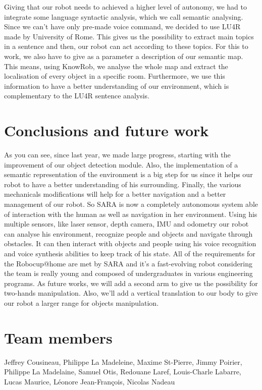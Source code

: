 \documentclass[runningheads,a4paper]{llncs}
\begin{document}
Giving that our robot needs to achieved a higher level of autonomy, we had to integrate some language syntactic analysis, which we call semantic analysing. Since we can't have only pre-made voice command, we decided to use LU4R \cite{lu4r} made by University of Rome. This gives us the possibility to extract main topics in a sentence and then, our robot can act according to these topics. For this to work, we also have to give as a parameter a description of our semantic map. This means, using KnowRob, we analyse the whole map and extract the localisation of every object in a specific room. Furthermore, we use this information to have a better understanding of our environment, which is complementary to the LU4R sentence analysis.


\section{Conclusions and future work}
\tab As you can see, since last year, we made large progress, starting with the improvement of our object detection module. Also, the implementation of a semantic representation of the environment is a big step for us since it helps our robot to have a better understanding of his surrounding. Finally, the various mechanicals modifications will help for a better navigation and a better management of our robot. So SARA is now a completely autonomous system able of interaction with the human as well as navigation in her environment. Using his multiple sensors, like laser sensor, depth camera, IMU and odometry our robot can analyse his environment, recognize people and objects and navigate through obstacles. It can then interact with objects and people using his voice recognition and voice synthesis abilities to keep track of his state. All of the requirements for the Robocup@home are met by SARA and it's a fast-evolving robot considering the team is really young and composed of undergraduates in various engineering programs. As future works, we will add a second arm to give us the possibility for two-hands manipulation. Also, we'll add a vertical translation to our body to give our robot a larger range for objects manipulation.


	

\section*{Team members}
Jeffrey Cousineau, Philippe La Madeleine, Maxime St-Pierre, Jimmy Poirier, Philippe La Madelaine, Samuel Otis, Redouane Laref, Louis-Charle Labarre, Lucas Maurice, Léonore Jean-François, Nicolas Nadeau 

\nocite{*}


\end{document}
